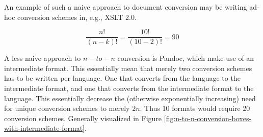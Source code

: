 \documentclass{scrreprt}
\begin{document}
An example of such a naive approach to document conversion may be writing ad-hoc conversion schemes in, e.g., XSLT 2.0.

\begin{equation}
\frac{n!}{(n-k)!} = \frac{10!}{(10-2)!} = 90
\label{eq:permutations-between-10-languages}
\end{equation}

A less naive approach to $n-to-n$ conversion is Pandoc, which make use of an intermediate format. This essentially mean that merely two conversion schemes has to be written per language. One that converts from the language to the intermediate format, and one that converts from the intermediate format to the language. This essentially decrease the (otherwise exponentially increasing) need for unique conversion schemes to merely $2n$. Thus 10 formats would require 20 conversion schemes. Generally visualized in Figure \ref{fig:n-to-n-conversion-boxes-with-intermediate-format}.
\end{document}
